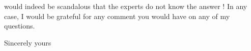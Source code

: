 would indeed be scandalous that the experts do not know the answer ! In any case, I would be grateful for any comment you would have on any of my questions.

Sincerely yours\\
\\
